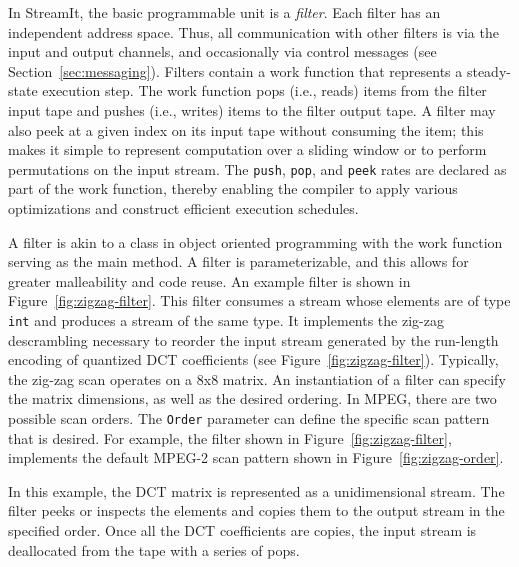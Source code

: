 In StreamIt, the basic programmable unit is a {\it filter}.  Each
filter has an independent address space. Thus, all communication with
other filters is via the input and output channels, and occasionally
via control messages (see Section~\ref{sec:messaging}).  Filters
contain a work function that represents a steady-state execution step.
The work function pops (i.e., reads) items from the filter input tape
and pushes (i.e., writes) items to the filter output tape. A filter
may also peek at a given index on its input tape without consuming the
item; this makes it simple to represent computation over a sliding
window or to perform permutations on the input stream. The {\tt push},
{\tt pop}, and {\tt peek} rates are declared as part of the work
function, thereby enabling the compiler to apply various optimizations
and construct efficient execution schedules.

A filter is akin to a class in object oriented programming with the
work function serving as the main method. A filter is parameterizable,
and this allows for greater malleability and code reuse. An example
filter is shown in Figure~\ref{fig:zigzag-filter}. This filter
consumes a stream whose elements are of type {\tt int} and produces a
stream of the same type. It implements the zig-zag descrambling
necessary to reorder the input stream generated by the run-length
encoding of quantized DCT coefficients (see
Figure~\ref{fig:zigzag-filter}). Typically, the zig-zag scan operates on a
8x8 matrix. An instantiation of a filter can specify the matrix
dimensions, as well as the desired ordering. In MPEG, there are two
possible scan orders. The {\tt Order} parameter can define the
specific scan pattern that is desired. For example, the filter shown
in Figure~\ref{fig:zigzag-filter}, implements the default MPEG-2 scan
pattern shown in Figure~\ref{fig:zigzag-order}.

In this example, the DCT matrix is represented as a unidimensional
stream. The filter peeks or inspects the elements and copies them to
the output stream in the specified order. Once all the DCT
coefficients are copies, the input stream is deallocated from the tape
with a series of pops.

